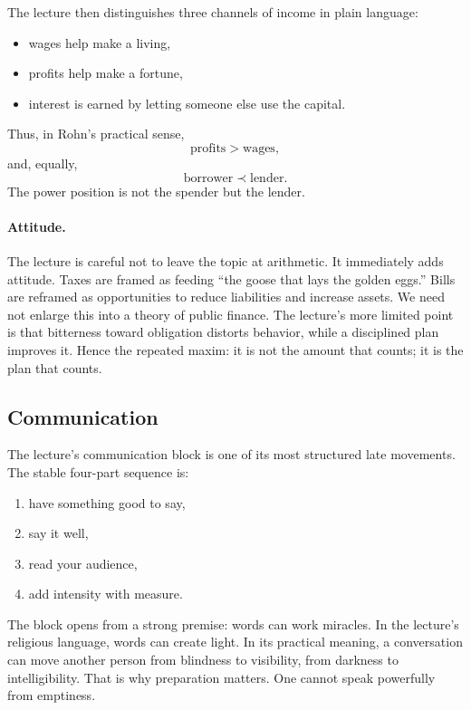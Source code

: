 The lecture then distinguishes three channels of income in plain language:
\begin{itemize}
\item wages help make a living,
\item profits help make a fortune,
\item interest is earned by letting someone else use the capital.
\end{itemize}
Thus, in Rohn's practical sense,
\begin{equation}
\mathrm{profits}>\mathrm{wages},
\end{equation}
and, equally,
\begin{equation}
\mathrm{borrower}\prec \mathrm{lender}.
\end{equation}
The power position is not the spender but the lender.

\paragraph{Attitude.} The lecture is careful not to leave the topic at arithmetic. It immediately adds attitude. Taxes are framed as feeding ``the goose that lays the golden eggs.'' Bills are reframed as opportunities to reduce liabilities and increase assets. We need not enlarge this into a theory of public finance. The lecture's more limited point is that bitterness toward obligation distorts behavior, while a disciplined plan improves it. Hence the repeated maxim: it is not the amount that counts; it is the plan that counts.

\subsection{Communication}

The lecture's communication block is one of its most structured late movements. The stable four-part sequence is:
\begin{enumerate}
\item have something good to say,
\item say it well,
\item read your audience,
\item add intensity with measure.
\end{enumerate}
The block opens from a strong premise: words can work miracles. In the lecture's religious language, words can create light. In its practical meaning, a conversation can move another person from blindness to visibility, from darkness to intelligibility. That is why preparation matters. One cannot speak powerfully from emptiness.

